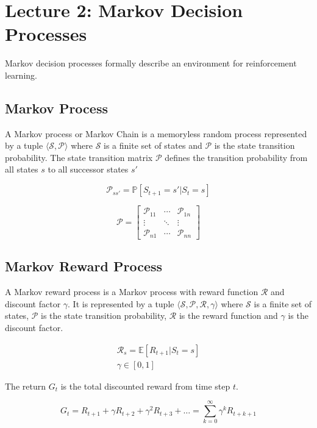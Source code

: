 \section{Lecture 2: Markov Decision Processes}

\noindent Markov decision processes formally describe an environment for reinforcement
learning.

\subsection{Markov Process}

A Markov process or Markov Chain is a memoryless random process represented by
a tuple $\langle\mathcal{S}, \mathcal{P}\rangle$ where $\mathcal{S}$ is a
finite set of states and $\mathcal{P}$ is the state transition probability. The
state transition matrix $\mathcal{P}$ defines the transition probability from
all states $s$ to all successor states $s'$

\[
    \mathcal{P}_{ss'} = \mathbb{P}[S_{t+1} = s' | S_t = s]
\]

\[
    \mathcal{P} = \begin{bmatrix}
        \mathcal{P}_{11} & \cdots & \mathcal{P}_{1n} \\
        \vdots           & \ddots & \vdots           \\
        \mathcal{P}_{n1} & \cdots & \mathcal{P}_{nn}
    \end{bmatrix}
\]

\subsection{Markov Reward Process}

A Markov reward process is a Markov process with reward function $\mathcal{R}$
and discount factor $\gamma$. It is represented by a tuple $\langle\mathcal{S},
    \mathcal{P}, \mathcal{R}, \gamma\rangle$ where $\mathcal{S}$ is a finite set of
states, $\mathcal{P}$ is the state transition probability, $\mathcal{R}$ is the
reward function and $\gamma$ is the discount factor.

\begin{gather*}
    \mathcal{R}_s = \mathbb{E}[R_{t+1} | S_t = s] \\
    \gamma \in [0, 1]
\end{gather*}

\noindent The return $G_t$ is the total discounted reward from time step $t$.

\[
    G_t = R_{t+1} + \gamma R_{t+2} + \gamma^2 R_{t+3} + \ldots = \sum_{k=0}^{\infty} \gamma^k R_{t+k+1}
\]

